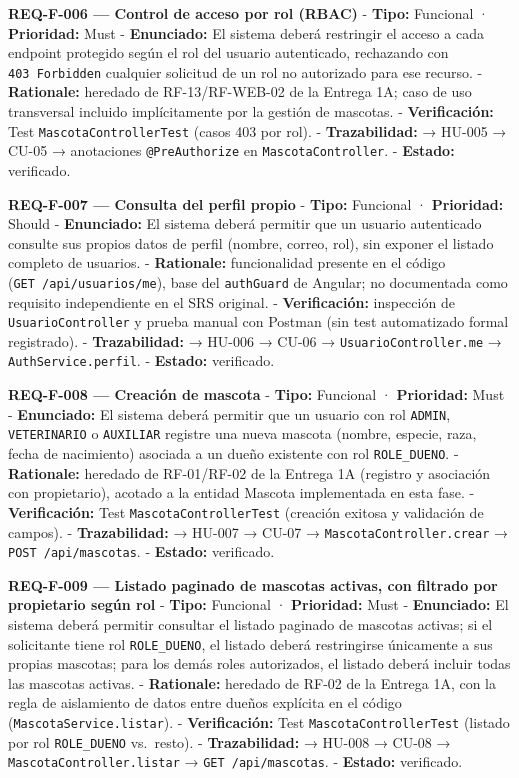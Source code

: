 \documentclass[
]{article}
\begin{document}
\textbf{REQ-F-006 --- Control de acceso por rol (RBAC)} - \textbf{Tipo:}
Funcional · \textbf{Prioridad:} Must - \textbf{Enunciado:} El sistema
deberá restringir el acceso a cada endpoint protegido según el rol del
usuario autenticado, rechazando con \texttt{403\ Forbidden} cualquier
solicitud de un rol no autorizado para ese recurso. -
\textbf{Rationale:} heredado de RF-13/RF-WEB-02 de la Entrega 1A; caso
de uso transversal incluido implícitamente por la gestión de mascotas. -
\textbf{Verificación:} Test \texttt{MascotaControllerTest} (casos 403
por rol). - \textbf{Trazabilidad:} → HU-005 → CU-05 → anotaciones
\texttt{@PreAuthorize} en \texttt{MascotaController}. - \textbf{Estado:}
verificado.

\textbf{REQ-F-007 --- Consulta del perfil propio} - \textbf{Tipo:}
Funcional · \textbf{Prioridad:} Should - \textbf{Enunciado:} El sistema
deberá permitir que un usuario autenticado consulte sus propios datos de
perfil (nombre, correo, rol), sin exponer el listado completo de
usuarios. - \textbf{Rationale:} funcionalidad presente en el código
(\texttt{GET\ /api/usuarios/me}), base del \texttt{authGuard} de
Angular; no documentada como requisito independiente en el SRS original.
- \textbf{Verificación:} inspección de \texttt{UsuarioController} y
prueba manual con Postman (sin test automatizado formal registrado). -
\textbf{Trazabilidad:} → HU-006 → CU-06 → \texttt{UsuarioController.me}
→ \texttt{AuthService.perfil}. - \textbf{Estado:} verificado.

\textbf{REQ-F-008 --- Creación de mascota} - \textbf{Tipo:} Funcional ·
\textbf{Prioridad:} Must - \textbf{Enunciado:} El sistema deberá
permitir que un usuario con rol \texttt{ADMIN}, \texttt{VETERINARIO} o
\texttt{AUXILIAR} registre una nueva mascota (nombre, especie, raza,
fecha de nacimiento) asociada a un dueño existente con rol
\texttt{ROLE\_DUENO}. - \textbf{Rationale:} heredado de RF-01/RF-02 de
la Entrega 1A (registro y asociación con propietario), acotado a la
entidad Mascota implementada en esta fase. - \textbf{Verificación:} Test
\texttt{MascotaControllerTest} (creación exitosa y validación de
campos). - \textbf{Trazabilidad:} → HU-007 → CU-07 →
\texttt{MascotaController.crear} → \texttt{POST\ /api/mascotas}. -
\textbf{Estado:} verificado.

\textbf{REQ-F-009 --- Listado paginado de mascotas activas, con filtrado
por propietario según rol} - \textbf{Tipo:} Funcional ·
\textbf{Prioridad:} Must - \textbf{Enunciado:} El sistema deberá
permitir consultar el listado paginado de mascotas activas; si el
solicitante tiene rol \texttt{ROLE\_DUENO}, el listado deberá
restringirse únicamente a sus propias mascotas; para los demás roles
autorizados, el listado deberá incluir todas las mascotas activas. -
\textbf{Rationale:} heredado de RF-02 de la Entrega 1A, con la regla de
aislamiento de datos entre dueños explícita en el código
(\texttt{MascotaService.listar}). - \textbf{Verificación:} Test
\texttt{MascotaControllerTest} (listado por rol \texttt{ROLE\_DUENO}
vs.~resto). - \textbf{Trazabilidad:} → HU-008 → CU-08 →
\texttt{MascotaController.listar} → \texttt{GET\ /api/mascotas}. -
\textbf{Estado:} verificado.
\end{document}
